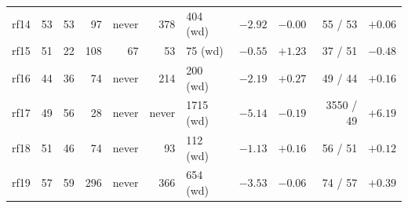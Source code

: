 \begin{tabular*}{\linewidth}{@{\extracolsep{\fill}}lrrrrrlrrrr@{}}
rf14 & 53 & 53 & 97 & never & 378 & 404 (wd) & $-2.92$ & $-0.00$ & 55 / 53 & $+0.06$\\
rf15 & 51 & 22 & 108 & 67 & 53 & 75 (wd) & $-0.55$ & $+1.23$ & 37 / 51 & $-0.48$\\
rf16 & 44 & 36 & 74 & never & 214 & 200 (wd) & $-2.19$ & $+0.27$ & 49 / 44 & $+0.16$\\
rf17 & 49 & 56 & 28 & never & never & 1715 (wd) & $-5.14$ & $-0.19$ & 3550 / 49 & $+6.19$\\
rf18 & 51 & 46 & 74 & never & 93 & 112 (wd) & $-1.13$ & $+0.16$ & 56 / 51 & $+0.12$\\
rf19 & 57 & 59 & 296 & never & 366 & 654 (wd) & $-3.53$ & $-0.06$ & 74 / 57 & $+0.39$\\
\bottomrule
\end{tabular*}
